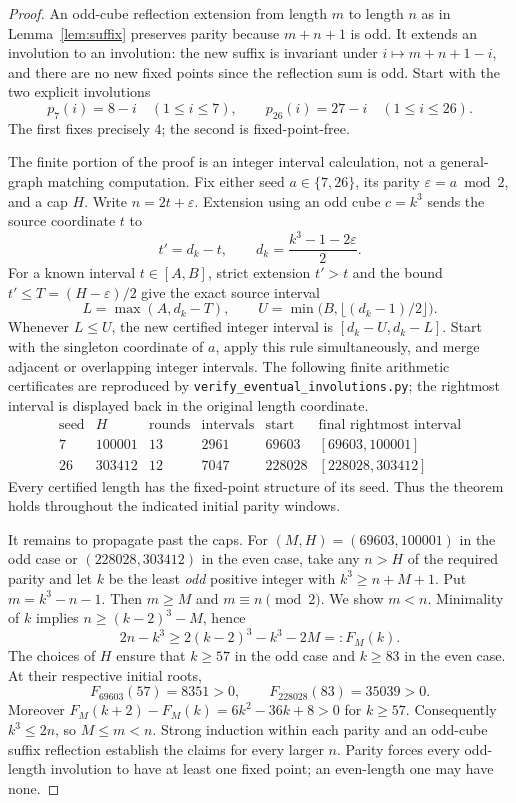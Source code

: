 \documentclass[9pt]{extarticle}
\begin{document}
\begin{proof}
An odd-cube reflection extension from length $m$ to length $n$ as in
Lemma~\ref{lem:suffix} preserves parity because $m+n+1$ is odd. It
extends an involution to an involution: the new suffix is invariant under
$i\mapsto m+n+1-i$, and there are no new fixed points since the
reflection sum is odd. Start with the two explicit involutions
\[
 p_7(i)=8-i\quad(1\le i\le7),\qquad
 p_{26}(i)=27-i\quad(1\le i\le26).
\]
The first fixes precisely $4$; the second is fixed-point-free.

The finite portion of the proof is an integer interval calculation, not
a general-graph matching computation. Fix either seed $a\in\{7,26\}$,
its parity $\varepsilon=a\bmod2$, and a cap $H$. Write
$n=2t+\varepsilon$. Extension using an odd cube $c=k^3$ sends the
source coordinate $t$ to
\[
 t'=d_k-t,\qquad d_k=\frac{k^3-1-2\varepsilon}{2}.
\]
For a known interval $t\in[A,B]$, strict extension $t'>t$ and the
bound $t'\le T=(H-\varepsilon)/2$ give the exact source interval
\[
 L=\max(A,d_k-T),\qquad
 U=\min\bigl(B,\lfloor(d_k-1)/2\rfloor\bigr).
\]
Whenever $L\le U$, the new certified integer interval is
$[d_k-U,d_k-L]$. Start with the singleton coordinate of $a$, apply
this rule simultaneously, and merge adjacent or overlapping integer
intervals. The following finite arithmetic certificates are reproduced
by \texttt{verify\_eventual\_involutions.py}; the rightmost interval
is displayed back in the original length coordinate.
\[
\begin{array}{c|r|r|r|r|c}
\text{seed}&H&\text{rounds}&\text{intervals}&\text{start}&
\text{final rightmost interval}\\\hline
7&100001&13&2961&69603&[69603,100001]\\
26&303412&12&7047&228028&[228028,303412]
\end{array}
\]
Every certified length has the fixed-point structure of its seed.
Thus the theorem holds throughout the indicated initial parity windows.

It remains to propagate past the caps. For $(M,H)=(69603,100001)$
in the odd case or $(228028,303412)$ in the even case, take any
$n>H$ of the required parity and let $k$ be the least \emph{odd}
positive integer with $k^3\ge n+M+1$. Put $m=k^3-n-1$.
Then $m\ge M$ and $m\equiv n\pmod2$. We show $m<n$.
Minimality of $k$ implies
$n\ge(k-2)^3-M$, hence
\[
 2n-k^3\ge2(k-2)^3-k^3-2M=:F_M(k).
\]
The choices of $H$ ensure that $k\ge57$ in the odd case and
$k\ge83$ in the even case. At their respective initial roots,
\[
 F_{69603}(57)=8351>0,\qquad F_{228028}(83)=35039>0.
\]
Moreover $F_M(k+2)-F_M(k)=6k^2-36k+8>0$ for $k\ge57$.
Consequently $k^3\le2n$, so $M\le m<n$. Strong induction within
each parity and an odd-cube suffix reflection establish the claims
for every larger $n$. Parity forces every odd-length involution to
have at least one fixed point; an even-length one may have none.
\end{proof}
\end{document}
